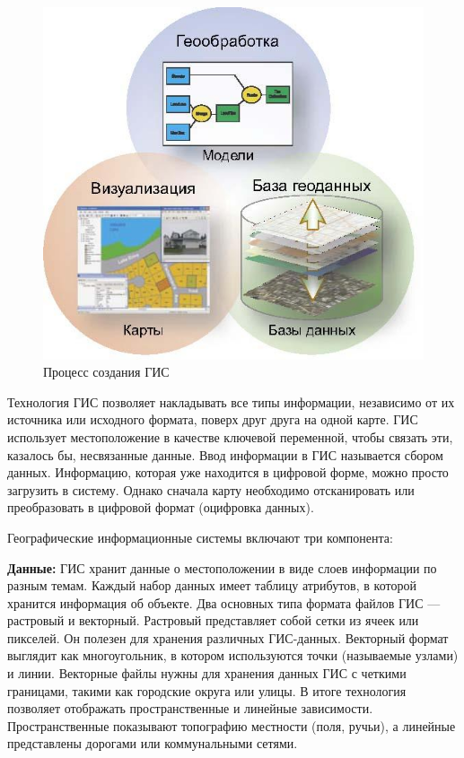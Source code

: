 \documentclass[732,14pt,final]{studrep}
\begin{document}
\begin{center}
  \begin{figure}[htp]
	\centering
	\includegraphics[width=0.7\linewidth]{pics/image15.png}
    \caption{Процесс создания ГИС}
    \label{fig:gis-design-process}
  \end{figure}
\end{center}

Технология ГИС позволяет накладывать все типы информации, независимо от их источника или исходного формата, поверх друг друга на одной карте. ГИС использует местоположение в качестве ключевой переменной, чтобы связать эти, казалось бы, несвязанные данные.
Ввод информации в ГИС называется сбором данных. Информацию, которая уже находится в цифровой форме, можно просто загрузить в систему. Однако сначала карту необходимо отсканировать или преобразовать в цифровой формат (оцифровка данных).

Географические информационные системы включают три компонента:

\textbf{Данные:} ГИС хранит данные о местоположении в виде слоев информации по разным темам. Каждый набор данных имеет таблицу атрибутов, в которой хранится информация об объекте. Два основных типа формата файлов ГИС — растровый и векторный. Растровый представляет собой сетки из ячеек или пикселей. Он полезен для хранения различных ГИС-данных. Векторный формат выглядит как многоугольник, в котором используются точки (называемые узлами) и линии. Векторные файлы нужны для хранения данных ГИС с четкими границами, такими как городские округа или улицы. В итоге технология позволяет отображать пространственные и линейные зависимости. Пространственные показывают топографию местности (поля, ручьи), а линейные представлены дорогами или коммунальными сетями.
\end{document}
